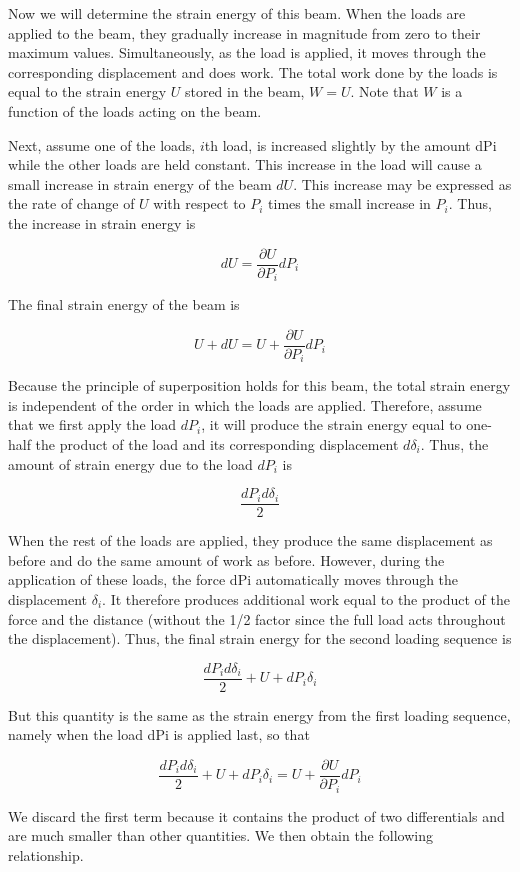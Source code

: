 \documentclass[
10pt,
a4paper,
openany,
svgnames,
]{book}
\begin{document}
Now we will determine the strain energy of this beam. When the loads are applied to the beam, they gradually increase in magnitude from zero to their maximum values. Simultaneously, as the load is applied, it moves through the corresponding displacement and does work. The total work done by the loads is equal to the strain energy $U$ stored in the beam, $W = U$. Note that $W$ is a function of the loads acting on the beam.

Next, assume one of the loads, $i$th load, is increased slightly by the amount dPi while the other loads are held constant. This increase in the load will cause a small increase in strain energy of the beam $dU$. This increase may be expressed as the rate of change of $U$ with respect to $P_i$ times the small increase in $P_i$. Thus, the increase in strain energy is

\[dU = \frac{{\partial U}}{{\partial {P_i}}}d{P_i}\]

The final strain energy of the beam is

\[U + dU = U + \frac{{\partial U}}{{\partial {P_i}}}d{P_i}\]

Because the principle of superposition holds for this beam, the total strain energy is independent of the order in which the loads are applied. Therefore, assume that we first apply the load $dP_i$, it will produce the strain energy equal to one-half the product of the load and its corresponding displacement $d\delta_i$. Thus, the amount of strain energy due to the load $dP_i$ is

\[\frac{dP_id\delta _i}{2}\]

When the rest of the loads are applied, they produce the same displacement as before and do the same amount of work as before. However, during the application of these loads, the force dPi automatically moves through the displacement $\delta_i$. It therefore produces additional work equal to the product of the force and the distance (without the 1/2 factor since the full load acts throughout the displacement). Thus, the final strain energy for the second loading sequence is

\[\frac{dP_id\delta _i}{2} + U + dP_i\delta _i\]

But this quantity is the same as the strain energy from the first loading sequence, namely when the load dPi is applied last, so that

\[\frac{dP_id\delta _i}{2} + U + dP_i\delta_i = U + \frac{\partial U}{\partial P_i}dP_i\]

We discard the first term because it contains the product of two differentials and are much smaller than other quantities. We then obtain the following relationship.
\end{document}
